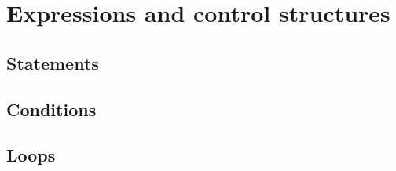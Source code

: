 \chapter{Expressions and control structures}\label{chapter:expressions}

\section{Statements}


\section{Conditions}


\section{Loops}



